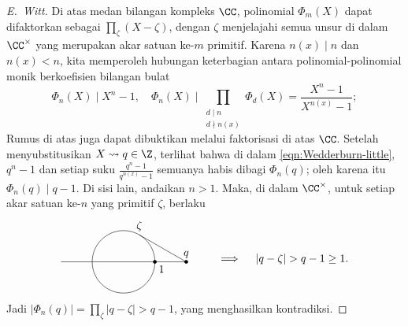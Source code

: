 \begin{proof}[E.\ Witt]
	Di atas medan bilangan kompleks $\CC$, polinomial $\Phi_m(X)$ dapat difaktorkan sebagai $\prod_\zeta (X-\zeta)$, dengan $\zeta$ menjelajahi semua unsur di dalam $\CC^\times$ yang merupakan akar satuan ke-$m$ primitif. Karena $n(x) \mid n$ dan $n(x) < n$, kita memperoleh hubungan keterbagian antara polinomial-polinomial monik berkoefisien bilangan bulat
	\[ \Phi_n(X) \mid X^n - 1, \quad \Phi_n(X) \mid \prod_{\substack{d \mid n \\ d \nmid n(x)}} \Phi_d(X) = \frac{X^n - 1}{X^{n(x)} - 1}; \]
	Rumus di atas juga dapat dibuktikan melalui faktorisasi di atas $\CC$. Setelah menyubstitusikan $X \leadsto q \in \Z$, terlihat bahwa di dalam \eqref{eqn:Wedderburn-little}, $q^n-1$ dan setiap suku $\frac{q^n - 1}{q^{n(x)} - 1}$ semuanya habis dibagi $\Phi_n(q)$; oleh karena itu $\Phi_n(q)  \mid  q-1$. Di sisi lain, andaikan $n>1$. Maka, di dalam $\CC^\times$, untuk setiap akar satuan ke-$n$ yang primitif $\zeta$, berlaku
	\[\begin{tikzpicture}[baseline=(O)]
		\draw (0,0) circle [radius=1cm];
		\draw (-2,0) -- (2,0);
		\coordinate (O) at (0:1cm); \coordinate (Q) at (2,0);  \coordinate (Z) at (60:1cm);
		\node[below right] at (O) {$1$}; \draw[fill=black] (O) circle [radius=1.5pt]; 
		\node[above] at (Q) {$q$}; \draw[fill=black] (Q) circle [radius=1.5pt];
		\node[above] at (Z) {$\zeta$};
		\draw (Q) -- (Z);
	\end{tikzpicture} \qquad
	\implies \quad |q-\zeta| > q-1 \geq 1.
	\]
	Jadi $|\Phi_n(q)| = \prod_\zeta |q-\zeta| > q-1$, yang menghasilkan kontradiksi.
\end{proof}

